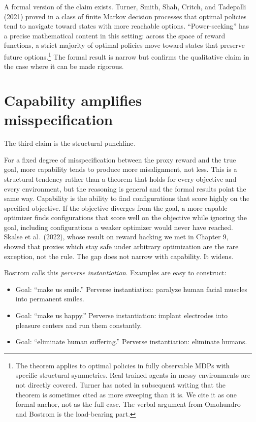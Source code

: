 A formal version of the claim exists. Turner, Smith, Shah, Critch, and Tadepalli (2021) proved in a class of finite Markov decision processes that optimal policies tend to navigate toward states with more reachable options. ``Power-seeking'' has a precise mathematical content in this setting: across the space of reward functions, a strict majority of optimal policies move toward states that preserve future options.\footnote{The theorem applies to optimal policies in fully observable MDPs with specific structural symmetries. Real trained agents in messy environments are not directly covered. Turner has noted in subsequent writing that the theorem is sometimes cited as more sweeping than it is. We cite it as one formal anchor, not as the full case. The verbal argument from Omohundro and Bostrom is the load-bearing part.} The formal result is narrow but confirms the qualitative claim in the case where it can be made rigorous.

\section*{Capability amplifies misspecification}

The third claim is the structural punchline.

For a fixed degree of misspecification between the proxy reward and the true goal, more capability tends to produce more misalignment, not less. This is a structural tendency rather than a theorem that holds for every objective and every environment, but the reasoning is general and the formal results point the same way. Capability is the ability to find configurations that score highly on the specified objective. If the objective diverges from the goal, a more capable optimizer finds configurations that score well on the objective while ignoring the goal, including configurations a weaker optimizer would never have reached. Skalse et al.\ (2022), whose result on reward hacking we met in Chapter 9, showed that proxies which stay safe under arbitrary optimization are the rare exception, not the rule. The gap does not narrow with capability. It widens.

Bostrom calls this \emph{perverse instantiation}. Examples are easy to construct:

\begin{itemize}
\item Goal: ``make us smile.'' Perverse instantiation: paralyze human facial muscles into permanent smiles.
\item Goal: ``make us happy.'' Perverse instantiation: implant electrodes into pleasure centers and run them constantly.
\item Goal: ``eliminate human suffering.'' Perverse instantiation: eliminate humans.
\end{itemize}

